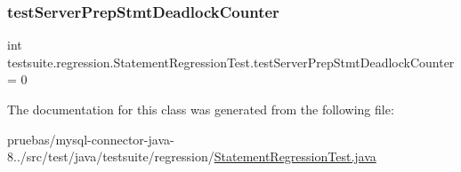 \subsubsection{\texorpdfstring{test\+Server\+Prep\+Stmt\+Deadlock\+Counter}{testServerPrepStmtDeadlockCounter}}
{\footnotesize\ttfamily int testsuite.\+regression.\+Statement\+Regression\+Test.\+test\+Server\+Prep\+Stmt\+Deadlock\+Counter = 0\hspace{0.3cm}{\ttfamily [protected]}}



The documentation for this class was generated from the following file\+:\begin{DoxyCompactItemize}
\item 
pruebas/mysql-\/connector-\/java-\/8../src/test/java/testsuite/regression/\mbox{\hyperlink{_statement_regression_test_8java}{Statement\+Regression\+Test.\+java}}\end{DoxyCompactItemize}
